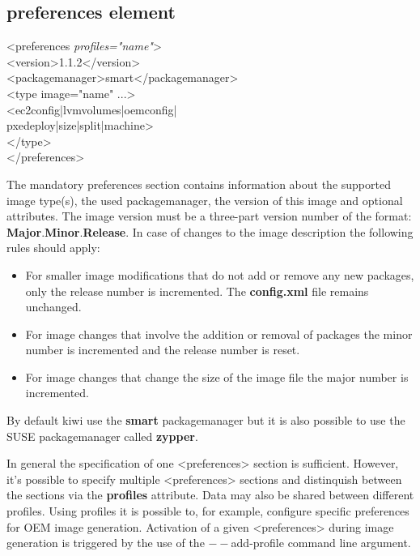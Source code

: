 \subsection{preferences element}
\begin{Command}{14cm}
<preferences \textit{profiles="name"}>\\
\hspace*{1cm}<version>1.1.2</version>\\
\hspace*{1cm}<packagemanager>smart</packagemanager>\\
\hspace*{1cm}<type image="name" ...>\\
\hspace*{2cm}<ec2config|lvmvolumes|oemconfig|\\
\hspace*{2cm} pxedeploy|size|split|machine>\\
\hspace*{1cm}</type>\\
</preferences>
\end{Command}

The mandatory preferences section contains information about the supported
image type(s), the used packagemanager, the version of this image and
optional attributes. The image version must be a three-part version number of
the format: \textbf{Major}.\textbf{Minor}.\textbf{Release}. In case of
changes to the image description the following rules should apply:

\begin{itemize}
\item For smaller image modifications that do not add or remove any
      new packages, only the release number is incremented.
      The \textbf{config.xml} file remains unchanged.
\item For image changes that involve the addition or removal of packages
      the minor number is incremented and the release number is reset.
\item For image changes that change the size of the image file
      the major number is incremented.
\end{itemize}

By default kiwi use the \textbf{smart} packagemanager but it is also possible
to use the SUSE packagemanager called \textbf{zypper}. 

In general the specification of one <preferences> section is sufficient.
However, it's possible to specify multiple <preferences> sections and
distinquish between the sections via the \textbf{profiles} attribute. Data
may also be shared between different profiles. Using profiles it is possible
to, for example, configure specific preferences for OEM image generation. 
Activation of a given <preferences> during image generation is triggered by
the use of the $--$add-profile command line argument.

